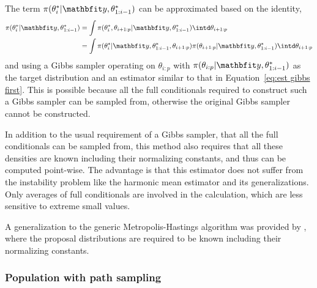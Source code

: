 The term $\pi(\theta_i^*|\data,\theta_{1:i-1}^*)$ can be approximated based on the identity,
\begin{align}
  \pi(\theta_i^*|\data,\theta_{1:i-1}^*)
  &= \int \pi(\theta_i^*,\theta_{i+1:p}|\data,\theta_{1:i-1}^*)
  \intd\theta_{i+1:p} \notag\\
  &= \int \pi(\theta_i^*|\data,\theta_{1:i-1}^*,\theta_{i+1:p})
  \pi(\theta_{i+1:p}|\data,\theta_{1:i-1}^*) \intd\theta_{i+1:p}
\end{align}
and using a Gibbs sampler operating on $\theta_{i:p}$ with $\pi(\theta_{i:p}|\data,\theta_{1:i-1}^*)$ as the target distribution and an estimator similar to that in Equation~\eqref{eq:est gibbs first}. This is possible because all the full conditionals required to construct such a Gibbs sampler can be sampled from, otherwise the original Gibbs sampler cannot be constructed.

In addition to the usual requirement of a Gibbs sampler, that all the full conditionals can be sampled from, this method also requires that all these densities are known including their normalizing constants, and thus can be computed point-wise. The advantage is that this estimator does not suffer from the instability problem like the harmonic mean estimator and its generalizations. Only averages of full conditionals are involved in the calculation, which are less sensitive to extreme small values.

A generalization to the generic Metropolis-Hastings algorithm was provided by \cite{Chib:2001gq}, where the proposal distributions are required to be known including their normalizing constants.

\subsubsection{Population \mcmc with path sampling}
\label{ssub:Population mcmc with path sampling}

